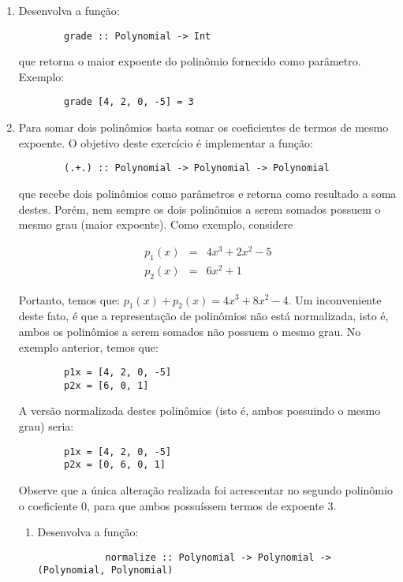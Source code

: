 \documentclass[10pt,a4paper]{report}
\begin{document}
\begin{enumerate}
    \item Desenvolva a fun\c{c}\~ao:
    \begin{verbatim}
		grade :: Polynomial -> Int
    \end{verbatim}
    que retorna o maior expoente do polin\^omio fornecido como par\^ametro. Exemplo:
    \begin{verbatim}
        grade [4, 2, 0, -5] = 3
    \end{verbatim}
    \item Para somar dois polin\^omios basta somar os coeficientes de termos de mesmo expoente. O objetivo deste
          exerc\'icio \'e implementar a fun\c{c}\~ao:
    \begin{verbatim}
		(.+.) :: Polynomial -> Polynomial -> Polynomial
    \end{verbatim}
    que recebe dois polin\^omios como par\^ametros e retorna como resultado a soma destes. Por\'em, nem sempre os dois
    polin\^omios a serem somados possuem o mesmo grau (maior expoente). Como exemplo, considere
    \begin{center}\[
	    \begin{array}{lcl}
    	   p_{1}(x) & = & 4x^{3} + 2x^{2} - 5\\
	       p_{2}(x) & = & 6x^{2} + 1
    	\end{array} \]   
    \end{center}    
    Portanto, temos que: $ p_{1}(x) + p_{2}(x) = 4x^{3} + 8x^{2} - 4$. Um inconveniente deste fato, \'e que a 
    representa\c{c}\~ao de polin\^omios n\~ao est\'a normalizada, isto \'e, ambos os polin\^omios a serem somados 
    n\~ao possuem o mesmo grau. No exemplo anterior, temos que:
    \begin{verbatim}
		p1x = [4, 2, 0, -5]
		p2x = [6, 0, 1]
    \end{verbatim} 
    A vers\~ao normalizada destes polin\^omios (isto \'e, ambos possuindo o mesmo grau) seria:
    \begin{verbatim}
		p1x = [4, 2, 0, -5]
		p2x = [0, 6, 0, 1]
    \end{verbatim} 
    Observe que a \'unica altera\c{c}\~ao realizada foi acrescentar no segundo polin\^omio o coeficiente $0$, para
    que ambos possu\'issem termos de expoente $3$.
    \begin{enumerate}
    	\item Desenvolva a fun\c{c}\~ao:
    	\begin{verbatim}
			normalize :: Polynomial -> Polynomial -> (Polynomial, Polynomial)

\end{verbatim}
\end{enumerate}
\end{enumerate}
\end{document}
